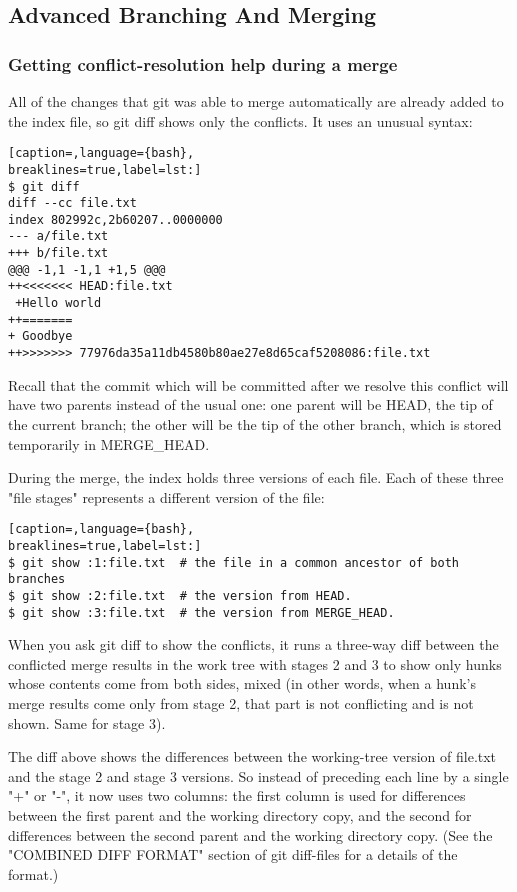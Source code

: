\subsection{Advanced Branching And Merging}
\subsubsection{Getting conflict-resolution help during a merge}

All of the changes that git was able to merge automatically are already added
to the index file, so git diff shows only the conflicts. It uses an unusual
syntax:
\lstset{basicstyle=\scriptsize, numbers=none, captionpos=b, tabsize=4}
\begin{lstlisting}[caption=,language={bash},
breaklines=true,label=lst:]
$ git diff
diff --cc file.txt
index 802992c,2b60207..0000000
--- a/file.txt
+++ b/file.txt
@@@ -1,1 -1,1 +1,5 @@@
++<<<<<<< HEAD:file.txt
 +Hello world
++=======
+ Goodbye
++>>>>>>> 77976da35a11db4580b80ae27e8d65caf5208086:file.txt
\end{lstlisting}

Recall that the commit which will be committed after we resolve this conflict
will have two parents instead of the usual one: one parent will be HEAD, the
tip of the current branch; the other will be the tip of the other branch, which
is stored temporarily in MERGE\_HEAD.

During the merge, the index holds three versions of each file. Each of these
three "file stages" represents a different version of the file:
\lstset{basicstyle=\scriptsize, numbers=none, captionpos=b, tabsize=4}
\begin{lstlisting}[caption=,language={bash},
breaklines=true,label=lst:]
$ git show :1:file.txt  # the file in a common ancestor of both branches
$ git show :2:file.txt  # the version from HEAD.
$ git show :3:file.txt  # the version from MERGE_HEAD.
\end{lstlisting}

When you ask git diff to show the conflicts, it runs a three-way diff between
the conflicted merge results in the work tree with stages 2 and 3 to show only
hunks whose contents come from both sides, mixed (in other words, when a hunk's
merge results come only from stage 2, that part is not conflicting and is not
shown. Same for stage 3).

The diff above shows the differences between the working-tree version of
file.txt and the stage 2 and stage 3 versions. So instead of preceding each
line by a single "+" or "-", it now uses two columns: the first column is used
for differences between the first parent and the working directory copy, and
the second for differences between the second parent and the working directory
copy. (See the "COMBINED DIFF FORMAT" section of git diff-files for a details
of the format.)

